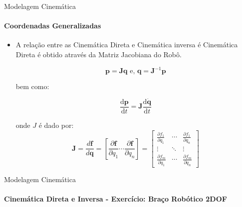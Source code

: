 \documentclass{beamer}
\begin{document}
\begin{frame}{Modelagem Cinemática}
    \framesubtitle{Coordenadas Generalizadas}
    \begin{itemize}
        \item A relação entre as Cinemática Direta e Cinemática inversa é Cinemática Direta é obtido através da Matriz Jacobiana do Robô.
        
        \begin{equation*}
            \mathbf{p} = \mathbf{J}{\mathbf{q}}
            \text{ e, }
            \mathbf{q} = \mathbf{J}^{-1}{\mathbf{p}}
        \end{equation*}

        bem como:

        \begin{equation*}
            \frac{\text{d}\mathbf{p}}{\text{d}t} = \mathbf{J}\frac{\text{d}\dot{\mathbf{q}}}{\text{d}t}
        \end{equation*}

        onde $J$ é dado por:
        \begin{equation*}
            \mathbf{J}
            =
            \frac{d \mathbf{f}}{d \mathbf{q}}
            =
            \left[ \frac{\partial \mathbf{f}}{\partial q_1}
            \cdots \frac{\partial \mathbf{f}}{\partial q_n} \right]
            =
            \begin{bmatrix}
            \frac{\partial f_1}{\partial q_1} & \cdots &
            \frac{\partial f_1}{\partial q_n} \\
            \vdots & \ddots & \vdots \\
            \frac{\partial f_m}{\partial q_1} & \cdots &
            \frac{\partial f_m}{\partial q_n}
            \end{bmatrix}
        \end{equation*}
    \end{itemize}        
\end{frame}

        

\begin{frame}{Modelagem Cinemática}
    \framesubtitle{Cinemática Direta e Inversa - Exercício: Braço Robótico 2DOF}
    

\end{frame}
\end{document}
